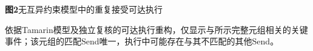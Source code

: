 \documentclass[varwidth=8.4cm,border=6pt]{standalone}
\begin{document}
\begin{minipage}{8.2cm}
  \centering
  
  \par\smallskip
  {\fontsize{9}{11}\selectfont\textbf{图2}\quad 无互异约束模型中的重复接受可达执行}
  \par\smallskip
  \begin{minipage}{8.2cm}
    \fontsize{7.5}{10}\selectfont
    依据Tamarin模型及独立复核的可达执行重构，仅显示与所示完整元组相关的关键事件；该元组的匹配Send唯一，执行中可能存在与其不匹配的其他Send。
  \end{minipage}
\end{minipage}
\end{document}
